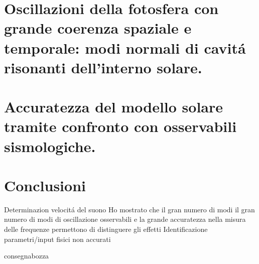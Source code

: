\documentclass[twoside,11pt,fleqn]{memoir}%
\def\versione{consegna}%
\def\bozza{bozza}
\begin{document}
\cleartorecto
\part{Oscillazioni della fotosfera con grande coerenza spaziale e temporale: modi normali di cavit\'a risonanti dell'interno solare.}



\cleartorecto
\part{Accuratezza del modello solare tramite confronto con osservabili sismologiche.}



\part{Conclusioni}

\begin{workout}[Conclusioni]
Determinazion velocit\'a del suono
Ho mostrato che il gran numero di modi il gran numero di modi di oscillazione osservabili e la grande accuratezza nella misura delle frequenze permettono di distinguere gli effetti 
Identificazione parametri/input fisici non accurati
\end{workout}

{\let\clearpage\relax\let\cleardoublepage\relax
\backmatter
}

%
{\let\clearpage\relax\let\cleardoublepage\relax
\printbibliography
\listoffigures
}

\ifx\versione\bozza
\woc
\erratac
\fi
\end{document}
